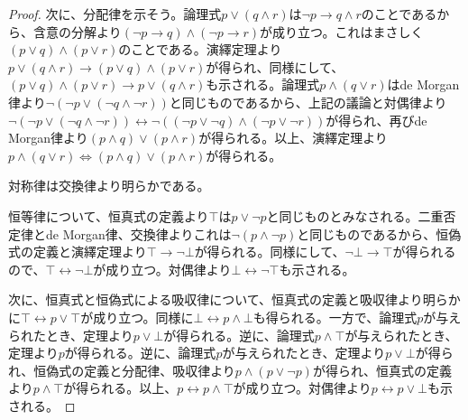 \documentclass[a4paper]{jsarticle}
\begin{document}
\begin{proof}
次に、分配律を示そう。論理式$p \vee (q \land r)$は$\neg p \rightarrow q \land r$のことであるから、含意の分解より$(\neg p \rightarrow q) \land (\neg p \rightarrow r)$が成り立つ。これはまさしく$(p \vee q) \land (p \vee r)$のことである。演繹定理より$p \vee (q \land r) \rightarrow (p \vee q) \land (p \vee r)$が得られ、同様にして、$(p \vee q) \land (p \vee r) \rightarrow p \vee (q \land r)$も示される。論理式$p \land (q \vee r)$はde Morgan律より$\neg\left( \neg p \vee (\neg q \land \neg r) \right)$と同じものであるから、上記の議論と対偶律より$\neg\left( \neg p \vee (\neg q \land \neg r) \right) \leftrightarrow \neg\left( (\neg p \vee \neg q) \land (\neg p \vee \neg r) \right)$が得られ、再びde Morgan律より$(p \land q) \vee (p \land r)$が得られる。以上、演繹定理より$p \land (q \vee r) \Leftrightarrow (p \land q) \vee (p \land r)$が得られる。\par
対称律は交換律より明らかである。\par
恒等律について、恒真式の定義より$\top$は$p \vee \neg p$と同じものとみなされる。二重否定律とde Morgan律、交換律よりこれは$\neg(p \land \neg p)$と同じものであるから、恒偽式の定義と演繹定理より$\top \rightarrow \neg\bot$が得られる。同様にして、$\neg\bot \rightarrow \top$が得られるので、$\top \leftrightarrow \neg\bot$が成り立つ。対偶律より$\bot \leftrightarrow \neg\top$も示される。\par
次に、恒真式と恒偽式による吸収律について、恒真式の定義と吸収律より明らかに$\top \leftrightarrow p \vee \top$が成り立つ。同様に$\bot \leftrightarrow p \land \bot$も得られる。一方で、論理式$p$が与えられたとき、定理より$p \vee \bot$が得られる。逆に、論理式$p \land \top$が与えられたとき、定理より$p$が得られる。逆に、論理式$p$が与えられたとき、定理より$p \vee \bot$が得られ、恒偽式の定義と分配律、吸収律より$p \land (p \vee \neg p)$が得られ、恒真式の定義より$p \land \top$が得られる。以上、$p \leftrightarrow p \land \top$が成り立つ。対偶律より$p \leftrightarrow p \vee \bot$も示される。
\end{proof}
\end{document}
